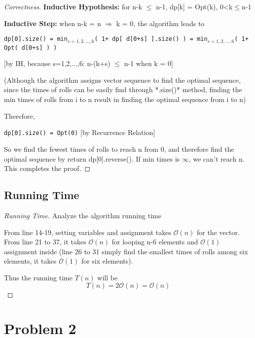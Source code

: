 \documentclass[openany]{article}
\begin{document}
\begin{proof}[Correctness]{}
    \textbf{Inductive Hypothesis:} for n-k $\leq$ n-1, dp[k] = Opt(k), 0<k$\leq$n-1
    
    \textbf{Inductive Step:} when n-k = n $\Rightarrow$ k = 0, the algorithm leads to
    \begin{center}
        \texttt{dp[0].size() = min$_{s=1,2,...,6}$( 1+ dp[ d[0+s] ].size() ) = min$_{s=1,2,...,6}$( 1+ Opt( d[0+s] ) )}
    \end{center}
    [by IH, because s=1,2,...,6: n-(k+s) $\leq$ n-1 when k = 0]

    (Although the algorithm assigns vector sequence to find the optimal sequence, since the times of rolls can be easily find through *.size()* method, finding the min times of rolls from i to n result in finding the optimal sequence from i to n)
    
    Therefore,
    \begin{center}
        \texttt{dp[0].size() = Opt(0)} [by Recurrence Relation]
    \end{center}
    
    So we find the fewest times of rolls to reach n from 0, and therefore find the optimal sequence by return dp[0].reverse(). If min times is $\infty$, we can't reach n. This completes the proof.

\end{proof}

\subsection*{Running Time}
\begin{proof}[Running Time]{Analyze the algorithm running time}
    	\renewcommand{\qedsymbol}{}
    	
    	From line 14-19, setting variables and assignment takes $\mathcal{O}(n)$ for the vector. From line 21 to 37, it takes $\mathcal{O}(n)$ for looping n-6 elements and $\mathcal{O}(1)$ assignment inside (line 26 to 31 simply find the smallest times of rolls among six elements, it takes $\mathcal{O}(1)$ for six elements).
    	
    	Thus the running time $T(n)$ will be \[T(n)=2\mathcal{O}(n)=\mathcal{O}(n)\]
\end{proof}

\section*{Problem 2}
\end{document}
